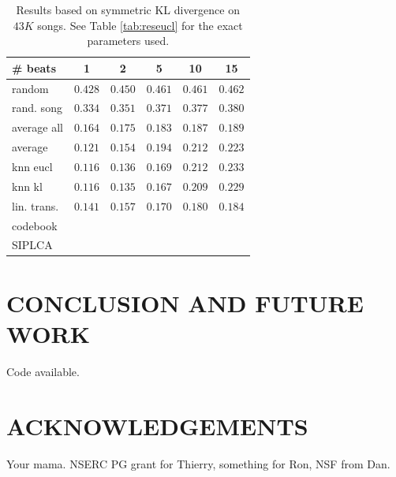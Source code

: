 \documentclass{article}
\begin{document}
\begin{table}[t]
\begin{small}
\begin{center}
\begin{tabular}{l|c|c|c|c|c|}
\# beats & 1 & 2 & 5 & 10 & 15 \\ \hline \hline
random & $0.428$ & $0.450$ & $0.461$ & $0.461$ & $0.462$  \\
rand. song & $0.334$ & $0.351$ & $0.371$ & $0.377$ & $0.380$  \\
average all & $0.164$ & $0.175$ & $0.183$ & $0.187$ & $0.189$ \\ 
average & $0.121$ & $0.154$ & $0.194$ & $0.212$ &  $0.223$ \\ \hline
knn eucl & $\mathbf{0.116}$ & $0.136$ & $0.169$ & $0.212$ & $0.233$ \\
knn kl & $\mathbf{0.116}$ & $\mathbf{0.135}$ & $\mathbf{0.167}$ & $0.209$ & $0.229$ \\
lin. trans. & $0.141$ & $0.157$ & $0.170$ & $\mathbf{0.180}$ & $\mathbf{0.184}$ \\
codebook & & & & &  \\
SIPLCA & & & & &  \\ \hline
\end{tabular}
\caption{Results based on symmetric KL divergence on $43K$ songs.
See Table \ref{tab:reseucl} for the exact parameters used.}
\label{tab:reskl}
\end{center}
\end{small}
\end{table}
\fi

\section{CONCLUSION AND FUTURE WORK}
\label{sec:conclusion}

Code available.


\section{ACKNOWLEDGEMENTS}
Your mama.
NSERC PG grant for Thierry, something for Ron, NSF from Dan.




\end{document}
